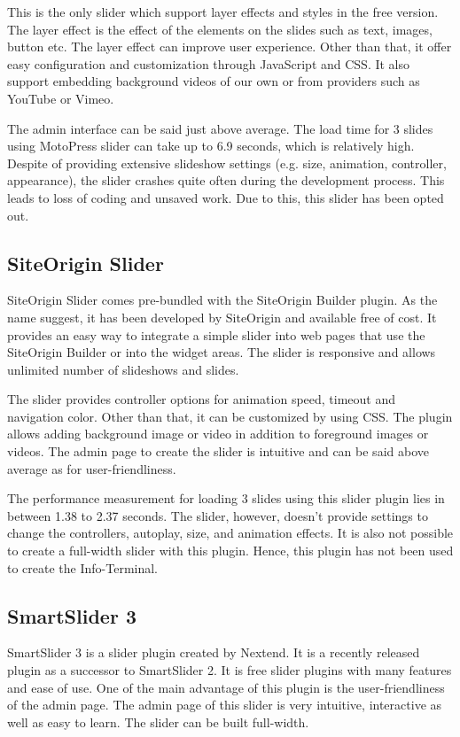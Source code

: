 This is the only slider which support layer effects and styles in the free version. The layer effect is the effect of the elements on the slides such as text, images, button etc. The layer effect can improve user experience. Other than that, it offer easy configuration and customization through JavaScript and CSS. It also support embedding background videos of our own or from providers such as YouTube or Vimeo.

The admin interface can be said just above average. The load time for 3 slides using MotoPress slider can take up to 6.9 seconds, which is relatively high. Despite of providing extensive slideshow settings (e.g. size, animation, controller, appearance), the slider crashes quite often during the development process. This leads to loss of coding and unsaved work. Due to this, this slider has been opted out.

\subsection{SiteOrigin Slider}
SiteOrigin Slider \cite{SiteOrigin.2015}\cite{GregPriday.2014} comes pre-bundled with the SiteOrigin Builder plugin. As the name suggest, it has been developed by SiteOrigin and available free of cost. It provides an easy way to integrate a simple slider into web pages that use the SiteOrigin Builder or into the widget areas. The slider is responsive and allows unlimited number of slideshows and slides.

The slider provides controller options for animation speed, timeout and navigation color. Other than that, it can be customized by using CSS. The plugin allows adding background image or video in addition to foreground images or videos. The admin page to create the slider is intuitive and can be said above average as for user-friendliness.

The performance measurement for loading 3 slides using this slider plugin lies in between 1.38 to 2.37 seconds. The slider, however, doesn't provide settings to change the controllers, autoplay, size, and animation effects. It is also not possible to create a full-width slider with this plugin. Hence, this plugin has not been used to create the Info-Terminal.

\subsection{SmartSlider 3}
SmartSlider 3 \cite{Nextendweb.2015}\cite{Nextendweb.2015b} is a slider plugin created by Nextend. It is a recently released plugin as a successor to SmartSlider 2. It is free slider plugins with many features and ease of use. One of the main advantage of this plugin is the user-friendliness of the admin page. The admin page of this slider is very intuitive, interactive as well as easy to learn. The slider can be built full-width.

